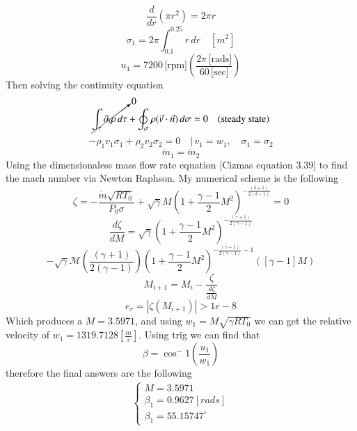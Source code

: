 \documentclass[12pt]{exam}
\begin{document}
\begin{questions}
\begin{solutionorbox}[\stretch{1}]
\[\frac{d}{dr} \left( \pi r^2 \right) = 2 \pi r\]
\[\sigma_1 = 2 \pi \int_{0.1}^{0.25} r \, dr \quad \left[ m^2 \right]\]
\[u_1 = 7200 \, \text{[rpm]} \left( \frac{2 \pi \, \text{[rads]}}{60 \, \text{[sec]}} \right)\]
Then solving the continuity equation
\[\cancelto{0}{\int_{\tau} \partial_t \rho \, d\tau} + \oint_{\sigma} \rho (\vec{v} \cdot \vec{n}) \, d\sigma = 0
\quad \text{(steady state)}\]
\[-\rho_1 v_1 \sigma_1 + \rho_2 v_2 \sigma_2 = 0 \quad \Bigg| \, v_1 = w_1, \quad \sigma_1 = \sigma_2\]
\[\dot{m}_1 = \dot{m}_2\]
Using the dimensionaless mass flow rate equation [Cizmas equation 3.39] to find the mach number via Newton Raphson.
My numerical scheme is the following
\[\zeta = -\frac{\dot{m}\sqrt{R T_0}}{P_0 \sigma} + \sqrt{\gamma} M \left( 1 + \frac{\gamma-1}{2} M^2 \right)^{-\frac{(\delta+1)}{2(\delta-1)}} = 0
\]
\[
\frac{d\zeta}{dM} = \sqrt{\gamma} \left( 1 + \frac{\gamma-1}{2} M^2 \right)^{-\frac{(\gamma+1)}{2(\gamma-1)}} 
\]\[ -\sqrt{\gamma} \mathcal{M} \left( \frac{(\gamma+1)}{2(\gamma-1)} \right) \left( 1 + \frac{\gamma-1}{2} M^2 \right)^{-\frac{(\gamma+1)}{2(\gamma-1)} - 1} 
\left( [\gamma - 1] M \right)
\]
\[M_{i+1} = M_i - \frac{\zeta}{\frac{d\zeta}{dM}}
\]
\[e_r = \left| \zeta(M_{i+1}) \right| > 1e-8
\]
Which produces a \(M = 3.5971\), and using \(w_1 = M\sqrt{\gamma R T_0}\) we can get the relative velocity of \(w_1 = 1319.7128 \left[\frac{m}{s}\right]\). Using trig we can find that 
\[\beta = \cos^-1\left(\frac{u_1}{w_1}\right)\]
therefore the final answers are the following
\begin{align*}
\begin{cases}
  M = 3.5971\\
  \beta_1 = 0.9627 \left[rads\right]\\
  \beta_1 = 55.15747^\circ
\end{cases}
\end{align*}

\end{solutionorbox}

\end{questions}

\end{document}
